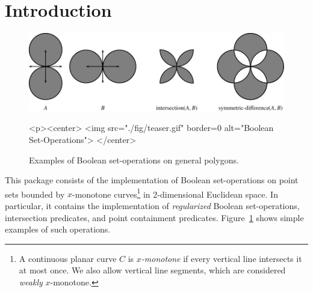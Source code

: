 \lcTex{%
  \newlength{\widthExtra}\setlength{\widthExtra}{1.1cm}
  \newlength{\widthLineReal}\setlength{\widthLineReal}{\linewidth}
  \addtolength{\widthLineReal}{-\widthExtra}
  \newlength{\minipageSpace}\setlength{\minipageSpace}{0.2cm}

  \newlength{\widthLeft}
  \newlength{\widthRight}
}

\newcommand{\reals}{{\rm I\!\hspace{-0.025em} R}}
\newcommand{\calC}{{\cal C}}
\newcommand{\calA}{{\cal A}}
\newcommand{\eps}{{\varepsilon}}
\newcommand{\dcel}{{\sc Dcel}}
\newcommand{\naive}{na\"{\i}ve}
\newcommand{\kdtree}{{\sc Kd}-tree}
\newcommand{\Cpp}{{C}{\tt ++}}

\section{Introduction}
\label{bobs_sec:intro}

\begin{figure}[!htp]
\begin{center}
\begin{ccTexOnly}
  \includegraphics{Boolean_set_operations_2/fig/teaser}
\end{ccTexOnly}
\label{fig:teaser}
\begin{ccHtmlOnly}
  <p><center>
    <img src="./fig/teaser.gif" border=0 alt="Boolean Set-Operations">
  </center>
\end{ccHtmlOnly}
\caption{Examples of Boolean set-operations on general polygons.} 
\end{center}
\end{figure}

This package consists of the implementation of Boolean set-operations
on point sets bounded by $x$-monotone curves\footnote{A continuous
planar curve $C$ is {\em $x$-monotone} if every vertical line intersects it at
most once. We also allow vertical line segments, which are considered
{\em weakly} $x$-monotone.} in 2-dimensional Euclidean space. In particular,
it contains the implementation of {\em regularized} Boolean set-operations,
intersection predicates, and point containment predicates.
Figure~\ref{fig:teaser} shows simple examples of such operations.

